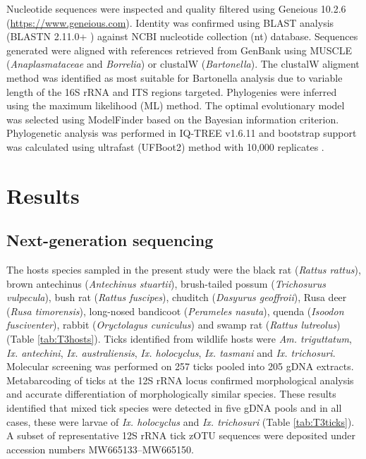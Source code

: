 \documentclass[a4paper, nobind]{templates/ociamthesis}
\begin{document}
Nucleotide sequences were inspected and quality filtered using Geneious 10.2.6 (\url{https://www.geneious.com}).
Identity was confirmed using BLAST analysis (BLASTN 2.11.0+ \autocite{zhangGreedyAlgorithmAligning2000,morgulisDatabaseIndexingProduction2008}) against NCBI nucleotide collection (nt) database.
Sequences generated were aligned with references retrieved from GenBank \autocite{bensonGenBank2017} using MUSCLE \autocite{edgarMUSCLEMultipleSequence2004} (\emph{Anaplasmataceae} and \emph{Borrelia}) or clustalW \autocite{larkinClustalClustalVersion2007} (\emph{Bartonella}).
The clustalW aligment method was identified as most suitable for Bartonella analysis due to variable length of the 16S rRNA and ITS regions targeted.
Phylogenies were inferred using the maximum likelihood (ML) method.
The optimal evolutionary model was selected using ModelFinder \autocite{kalyaanamoorthyModelFinderFastModel2017} based on the Bayesian information criterion. Phylogenetic analysis was performed in IQ-TREE v1.6.11 \autocite{nguyenIQTREEFastEffective2015} and bootstrap support was calculated using ultrafast (UFBoot2) method with 10,000 replicates \autocite{hoangUFBoot2ImprovingUltrafast2018}.

\hypertarget{results}{%
\section{Results}\label{results}}

\hypertarget{next-generation-sequencing}{%
\subsection{Next-generation sequencing}\label{next-generation-sequencing}}

The hosts species sampled in the present study were the black rat (\emph{Rattus rattus}), brown antechinus (\emph{Antechinus stuartii}), brush-tailed possum (\emph{Trichosurus vulpecula}), bush rat (\emph{Rattus fuscipes}), chuditch (\emph{Dasyurus geoffroii}), Rusa deer (\emph{Rusa timorensis}), long-nosed bandicoot (\emph{Perameles nasuta}), quenda (\emph{Isoodon fusciventer}), rabbit (\emph{Oryctolagus cuniculus}) and swamp rat (\emph{Rattus lutreolus}) (Table \ref{tab:T3hosts}).
Ticks identified from wildlife hosts were \emph{Am. triguttatum}, \emph{Ix. antechini}, \emph{Ix. australiensis}, \emph{Ix. holocyclus}, \emph{Ix. tasmani} and \emph{Ix. trichosuri}.
Molecular screening was performed on 257 ticks pooled into 205 gDNA extracts.
Metabarcoding of ticks at the 12S rRNA locus confirmed morphological analysis and accurate differentiation of morphologically similar species.
These results identified that mixed tick species were detected in five gDNA pools and in all cases, these were larvae of \emph{Ix. holocyclus} and \emph{Ix. trichosuri} (Table \ref{tab:T3ticks}).
A subset of representative 12S rRNA tick zOTU sequences were deposited under accession numbers MW665133--MW665150.
\end{document}
